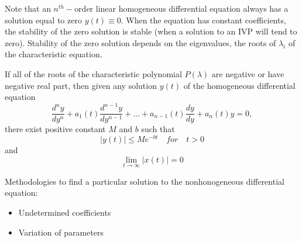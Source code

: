 Note that an $n^{th}-$order linear homogeneous differential equation always has a solution equal to zero $y(t)\equiv 0$. When the equation has constant coefficients, the stability of the zero solution is stable (when a solution to an IVP will tend to zero). Stability of the zero solution depends on the eigenvalues, the roots of $\lambda_i$ of the characteristic equation.

\begin{theorem}
If all of the roots of the characteristic polynomial $P(\lambda)$ are negative or have negative real part, then given any solution $y(t)$ of the homogeneous differential equation $$\frac{d^n y}{dy^n}+a_1(t)\frac{d^{n-1}y}{dy^{n-1}}+\dots+a_{n-1}(t)\frac{dy}{dy}+a_n(t)y=0,$$ there exist positive constant $M$ and $b$ such that
$$|y(t)|\leq Me^{-bt}\quad for \quad t>0$$
and
$$\lim _{t\rightarrow \infty} |x(t)|=0$$
\end{theorem}




Methodologies to find a particular solution to the nonhonogeneous differential equation:
\begin{itemize}
\item Undetermined coefficients
\item Variation of parameters
\end{itemize}


